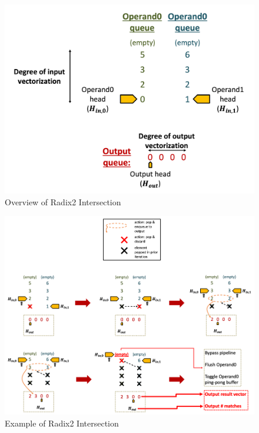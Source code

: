 \begin{figure}[H]
    \centering
    \includegraphics[width=\linewidth]{figures/radix2_intersect_overview.png}
    \caption{Overview of Radix2 Intersection}
    \label{fig:radix2-overview}
\end{figure}

\begin{figure}[H]
    \centering
    \includegraphics[width=\linewidth]{figures/radix2_intersect_example.png}
    \caption{Example of Radix2 Intersection}
    \label{fig:radix2-example}
\end{figure}

